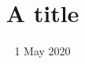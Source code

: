 \documentclass{article}
\makeatletter
\def\leak{LEAKED}
\renewcommand*{\author}[1]{\begingroup\aftergroup\leak\gdef\theauthorname{#1}}
\makeatother
\title{A title}
\date{1 May 2020}
\author{Alice}

\maketitle
Text.\footnote{A note.}

